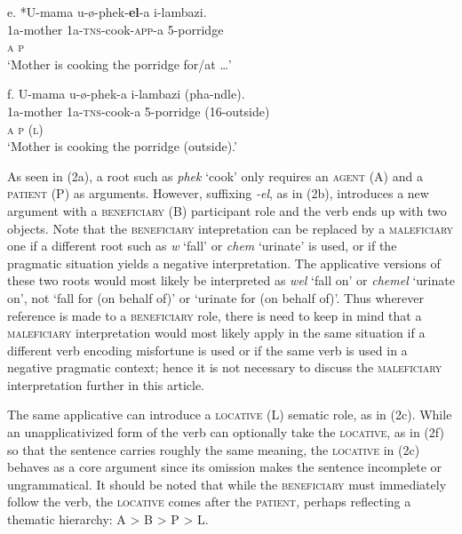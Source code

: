 \gll   e.  *U-mama  u-ø-phek-\textbf{el}{}-a       i-lambazi.\\
         1a-mother  1a-\textsc{tns}{}-cook-\textsc{app}{}-a  5-porridge \\
         \textsc{a                  p}\\
\glt     ‘Mother is cooking the porridge for/at …’
\z

\gll   f.  U-mama       u-ø-phek-a    i-lambazi  (pha-ndle).\\
         1a-mother    1a-\textsc{tns}{}-cook-a  5-porridge  (16-outside)\\
         \textsc{a                p      (l)}\\
\glt     ‘Mother is cooking the porridge (outside).’
\z

As seen in (2a), a root such as \textit{phek} ‘cook’ only requires an \textsc{agent} (A) and a \textsc{patient} (P) as arguments. However, suffixing \textit{{}-el}, as in (2b), introduces a new argument with a \textsc{beneficiary} (B) participant role and the verb ends up with two objects. Note that the \textsc{beneficiary} intepretation can be replaced by a \textsc{maleficiary} one if a different root such as \textit{w} ‘fall’ or \textit{chem} ‘urinate’ is used, or if the pragmatic situation yields a negative interpretation.  The applicative versions of these two roots would most likely be interpreted as \textit{wel} ‘fall on’ or \textit{chemel} ‘urinate on’, not ‘fall for (on behalf of)’ or ‘urinate for (on behalf of)’. Thus wherever reference is made to a \textsc{beneficiary} role, there is need to keep in mind that a \textsc{maleficiary} interpretation would most likely apply in the same situation if a different verb encoding misfortune is used or if the same verb is used in a negative pragmatic context; hence it is not necessary to discuss the \textsc{maleficiary} interpretation further in this article. 

  The same applicative can introduce a \textsc{locative} (L) sematic role, as in (2c). While an unapplicativized form of the verb can optionally take the \textsc{locative}, as in (2f) so that the sentence carries roughly the same meaning, the \textsc{locative} in (2c) behaves as a core argument since its omission makes the sentence incomplete or ungrammatical. It should be noted that while the \textsc{beneficiary} must immediately follow the verb, the \textsc{locative} comes after the \textsc{patient}\textit{,} perhaps reflecting a thematic hierarchy:  A {\textgreater} B {\textgreater} P {\textgreater} L.  

